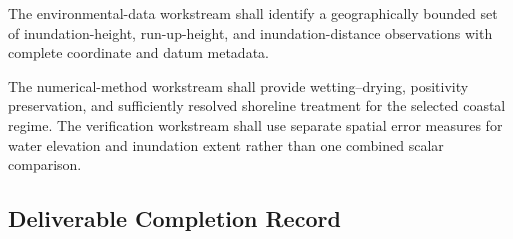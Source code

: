 The environmental-data workstream shall identify a geographically bounded set of inundation-height, run-up-height, and inundation-distance observations with complete coordinate and datum metadata. 

The numerical-method workstream shall provide wetting--drying, positivity preservation, and sufficiently resolved shoreline treatment for the selected coastal regime. The verification workstream shall use separate spatial error measures for water elevation and inundation extent rather than one combined scalar comparison.

\subsection{Deliverable Completion Record}
\label{sec:res-phy-nrs-completion-record}

%
%
%
